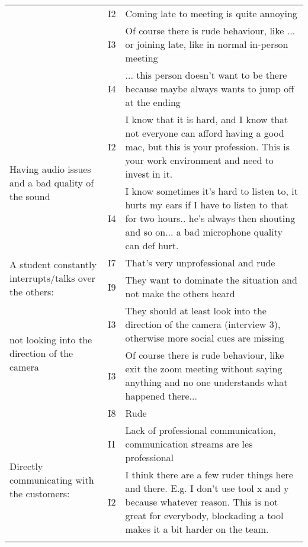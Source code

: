 \begin{longtable}[ht]{ p{}   p{}  p{} }
      & I2 & Coming late to meeting is quite annoying \\
      & I3 & Of course there is rude behaviour, like ... or joining late, like in normal in-person meeting \\
      & I4 & ... this person doesn't want to be there because maybe always wants to jump off at the ending \\
    \hline
     \multirow{2}{4cm}{Having audio issues and a bad quality of the sound} & I2 & I know that it is hard, and I know that not everyone can afford having a good mac, but this is your profession. This is your work environment and need to invest in it. \\
    & I4 & I know sometimes it's hard to listen to, it hurts my ears if I have to listen to that for two hours.. he's always then shouting and so on... a bad microphone quality can def hurt. \\
    \hline
     \multirow{2}{4cm}{A student constantly interrupts/talks over the others:} & I7 & That’s very unprofessional and rude \\
    & I9 & They want to dominate the situation and not make the others heard \\
    \hline
     \multirow{2}{4cm}{not looking into the direction of the camera} & I3 & They should at least look into the direction of the camera (interview 3), otherwise more social cues are missing \\
    \hline
     \multirow{2}{4cm}{Walking out of the meeting unannounced:} & I3 & Of course there is rude behaviour, like exit the zoom meeting without saying anything and no one understands what happened there... \\
     & I8 & Rude \\
    \hline
     \multirow{2}{4cm}{Directly communicating with the customers:} & I1 & Lack of professional communication, communication streams are les professional \\
    \hline
     \multirow{2}{4cm}{Not agreeing to using certain tools} & I2 & I think there are a few ruder things here and there. E.g. I don't use tool x and y because whatever reason. This is not great for everybody, blockading a tool makes it a bit harder on the team. \\
    \hline
\label{tab:multicol}
\end{longtable}

